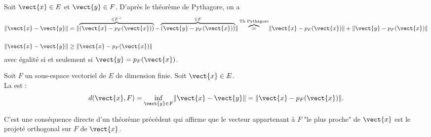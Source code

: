 \documentclass{book}
\begin{document}
\begin{Demonstration}
Soit $\vect{x} \in E$ et $\vect{y} \in F$. D'après le théorème de Pythagore, on a
$$\begin{aligned}
\norme{\vect{x} - \vect{y}}&=\norme{ \overbrace{(\vect{x}- p_F(\vect{x}))}^{\in F^{\perp} }-\overbrace{(\vect{y}- p_F(\vect{x}))}^{\in F }}\overbrace{=}^{\text{Th Pythagore}} \norme{\vect{x}- p_F(\vect{x})  } +\norme{ \vect{y}- p_F(\vect{x}) }\\
\\
\norme{\vect{x} - \vect{y}}&\geq \norme{\vect{x}- p_F(\vect{x})  }
\end{aligned}$$
avec égalité si et seulement si $\vect{y} = p_F(\vect{x})$.
\end{Demonstration}
\begin{DefinitionProposition}
Soit $F$ un sous-espace vectoriel de $E$ de dimension finie. Soit $\vect{x} \in E$.\\
La   est :
$$d(\vect{x},F)=\inf_{\vect{y}\in F} \norme{\vect{x} - \vect{y}} = \norme{\vect{x} - p_F(\vect{x})} .$$
\end{DefinitionProposition}
\begin{Demonstration}
C'est une conséquence directe d'un théorème précédent qui affirme que le vecteur appartenant à $F$ "le plus proche" de $\vect{x}$ est le projeté orthogonal sur $F$ de $\vect{x}$.
\end{Demonstration}
\end{document}

